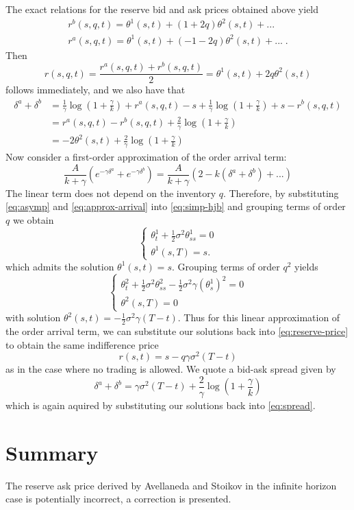 The exact relations for the reserve bid and ask prices obtained above yield
\begin{gather}
    r^b(s,q,t)=\theta^1(s,t)+(1+2q)\theta^2(s,t)+...\\
    r^a(s,q,t)=\theta^1(s,t)+(-1-2q)\theta^2(s,t)+...\;.
\end{gather}
Then
\begin{equation}\label{eq:reserve-price}
    r(s,q,t)=\frac{r^a(s,q,t)+r^b(s,q,t)}{2}=\theta^1(s,t)+2q\theta^2(s,t)
\end{equation}
follows immediately, and we also have that
\begin{equation}\label{eq:spread}
    \begin{aligned}
        \delta^a+\delta^b&=\frac{1}{\gamma}\log\left(1+\frac{\gamma}{k}\right)+r^a(s,q,t)-s+\frac{1}{\gamma}\log\left(1+\frac{\gamma}{k}\right)+s-r^b(s,q,t)\\
        &=r^a(s,q,t)-r^b(s,q,t)+\frac{2}{\gamma}\log\left(1+\frac{\gamma}{k}\right)\\
        &=-2\theta^2(s,t)+\frac{2}{\gamma}\log\left(1+\frac{\gamma}{k}\right)
    \end{aligned}
\end{equation}
Now consider a first-order approximation of the order arrival term:
\begin{equation}\label{eq:approx-arrival}
    \frac{A}{k+\gamma}(e^{-\gamma\delta^a}+e^{-\gamma\delta^b})=\frac{A}{k+\gamma}(2-k(\delta^a+\delta^b)+...)
\end{equation}
The linear term does not depend on the inventory $q$. Therefore, by substituting
\ref{eq:asymp} and \ref{eq:approx-arrival} into \ref{eq:simp-hjb} and 
grouping terms of order $q$ we obtain
\begin{equation}
    \begin{cases} 
        \theta^1_t+\frac{1}{2}\sigma^2\theta^1_{ss}=0\\
        \theta^1(s,T)=s.
    \end{cases}
\end{equation}
which admits the solution $\theta^1(s,t)=s$. Grouping terms of order $q^2$ yields
\begin{equation}
    \begin{cases}
        \theta^2_t+\frac{1}{2}\sigma^2\theta^2_{ss}-\frac{1}{2}\sigma^2\gamma(\theta^1_s)^2=0\\
        \theta^2(s,T)=0
    \end{cases}
\end{equation}
with solution $\theta^2(s,t)=-\frac{1}{2}\sigma^2\gamma(T-t)$.
Thus for this linear approximation of the order arrival term, we can substitute our
solutions back into \ref{eq:reserve-price} to obtain the same indifference price
\begin{equation}
    r(s,t)=s-q\gamma\sigma^2(T-t)
\end{equation}
as in the case where no trading is allowed. We quote a bid-ask spread given by
\begin{equation}
    \delta^a+\delta^b=\gamma\sigma^2(T-t)+\frac{2}{\gamma}\log\left(1+\frac{\gamma}{k}\right)
\end{equation}
which is again aquired by substituting our solutions back into \ref{eq:spread}.

\section{Summary}\label{sec:3.9}
The reserve ask price derived by Avellaneda and Stoikov in the infinite horizon case
is potentially incorrect, a correction is presented.